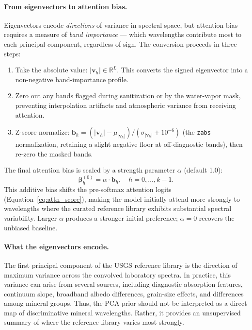 \documentclass[11pt]{report}
\newcommand{\R}{\mathbb{R}}
\begin{document}
\paragraph{From eigenvectors to attention bias.}
Eigenvectors encode \emph{directions} of variance in spectral space, but attention bias requires a measure of \emph{band importance} --- which wavelengths contribute most to each principal component, regardless of sign. The conversion proceeds in three steps:
\begin{enumerate}[nosep]
  \item Take the absolute value: $|\mathbf{v}_h| \in \R^L$. This converts the signed eigenvector into a non-negative band-importance profile.
  \item Zero out any bands flagged during sanitization or by the water-vapor mask, preventing interpolation artifacts and atmospheric variance from receiving attention.
  \item Z-score normalize: $\mathbf{b}_h = (|\mathbf{v}_h| - \mu_{|\mathbf{v}_h|}) / (\sigma_{|\mathbf{v}_h|} + 10^{-6})$ (the \texttt{zabs} normalization, retaining a slight negative floor at off-diagnostic bands), then re-zero the masked bands.
\end{enumerate}
The final attention bias is scaled by a strength parameter $\alpha$ (default 1.0):
\begin{equation}
\bm{\beta}_h^{(0)} = \alpha \cdot \mathbf{b}_h, \quad h = 0, \ldots, k-1.
\label{eq:prior_init}
\end{equation}
This additive bias shifts the pre-softmax attention logits (Equation~\ref{eq:attn_score}), making the model initially attend more strongly to wavelengths where the curated reference library exhibits substantial spectral variability. Larger $\alpha$ produces a stronger initial preference; $\alpha = 0$ recovers the unbiased baseline.

\paragraph{What the eigenvectors encode.}
The first principal component of the USGS reference library is the direction of maximum variance across the convolved laboratory spectra. In practice, this variance can arise from several sources, including diagnostic absorption features, continuum slope, broadband albedo differences, grain-size effects, and differences among mineral groups. Thus, the PCA prior should not be interpreted as a direct map of discriminative mineral wavelengths. Rather, it provides an unsupervised summary of where the reference library varies most strongly.
\end{document}
